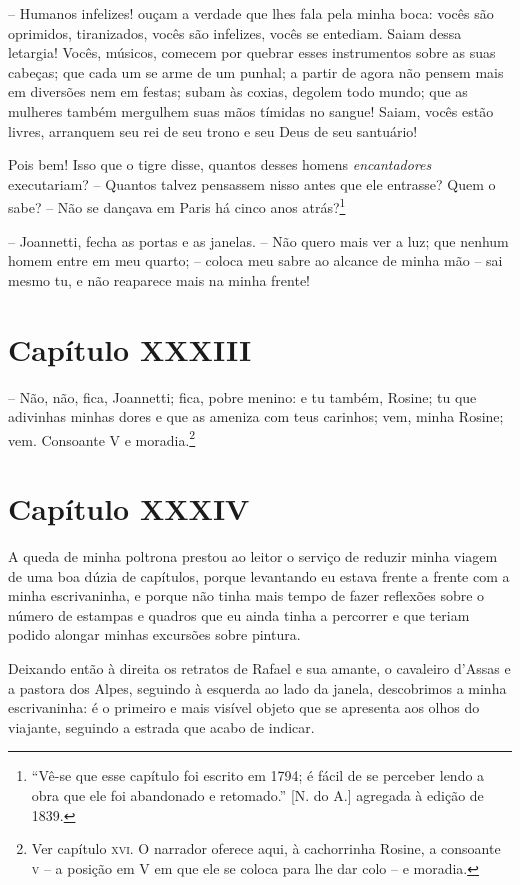  -- Humanos infelizes! ouçam a verdade que lhes fala pela minha boca:
vocês são oprimidos, tiranizados, vocês são infelizes, vocês se
entediam. Saiam dessa letargia! Vocês, músicos, comecem por quebrar
esses instrumentos sobre as suas cabeças; que cada um se arme de um
punhal; a partir de agora não pensem mais em diversões nem em festas;
subam às coxias, degolem todo mundo; que as mulheres também mergulhem
suas mãos tímidas no sangue! Saiam, vocês estão livres, arranquem seu
rei de seu trono e seu Deus de seu santuário!

 Pois bem! Isso que o tigre disse, quantos desses homens
\textit{encantadores} executariam? -- Quantos talvez pensassem nisso
antes que ele entrasse? Quem o sabe? -- Não se dançava em Paris há
cinco anos atrás?\footnote{ ``Vê-se que esse capítulo foi escrito em
1794; é fácil de se perceber lendo a obra que ele foi abandonado e
retomado.'' [N. do A.] agregada à edição de 1839.}

 -- Joannetti, fecha as portas e as janelas. -- Não quero mais ver a
luz; que nenhum homem entre em meu quarto; -- coloca meu sabre ao
alcance de minha mão -- sai mesmo tu, e não reaparece mais na minha
frente!

\section*{Capítulo XXXIII}

 -- Não, não, fica, Joannetti; fica, pobre menino: e tu também, Rosine;
tu que adivinhas minhas dores e que as ameniza com teus carinhos; vem,
minha Rosine; vem. Consoante V e moradia.\footnote{ Ver capítulo \textsc{xvi}. O
narrador oferece aqui, à cachorrinha Rosine, a consoante \textsc{v} -- a
posição em V em que ele se coloca para lhe dar colo -- e moradia.} 

\section*{Capítulo XXXIV}

 A queda de minha poltrona prestou ao leitor o serviço de reduzir minha
viagem de uma boa dúzia de capítulos, porque levantando eu estava
frente a frente com a minha escrivaninha, e porque não tinha mais tempo
de fazer reflexões sobre o número de estampas e quadros que eu ainda
tinha a percorrer e que teriam podido alongar minhas excursões sobre pintura.

 Deixando então à direita os retratos de Rafael e sua amante, o
cavaleiro d’Assas e a pastora dos Alpes, seguindo à esquerda ao lado da
janela, descobrimos a minha escrivaninha: é o primeiro e mais visível
objeto que se apresenta aos olhos do viajante, seguindo a estrada que
acabo de indicar.

